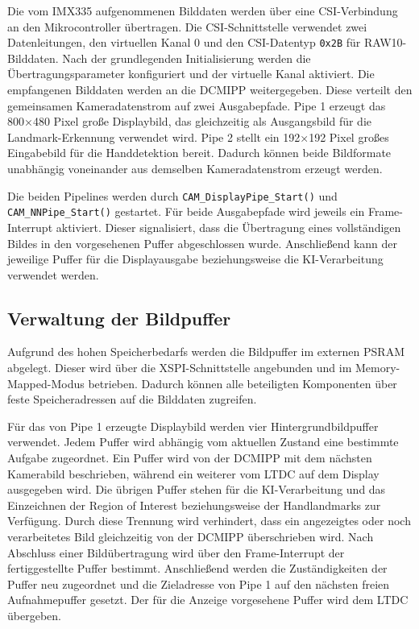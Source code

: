 Die vom IMX335 aufgenommenen Bilddaten werden über eine CSI-Verbindung an den Mikrocontroller übertragen. Die CSI-Schnittstelle verwendet zwei Datenleitungen, den virtuellen Kanal 0 und den CSI-Datentyp \texttt{0x2B} für RAW10-Bilddaten. Nach der grundlegenden Initialisierung werden die Übertragungsparameter konfiguriert und der virtuelle Kanal aktiviert. Die empfangenen Bilddaten werden an die DCMIPP weitergegeben. Diese verteilt den gemeinsamen Kameradatenstrom auf zwei Ausgabepfade. Pipe 1 erzeugt das 800×480 Pixel große Displaybild, das gleichzeitig als Ausgangsbild für die Landmark-Erkennung verwendet wird. Pipe 2 stellt ein 192×192 Pixel großes Eingabebild für die Handdetektion bereit. Dadurch können beide Bildformate unabhängig voneinander aus demselben Kameradatenstrom erzeugt werden.

Die beiden Pipelines werden durch \texttt{CAM\_DisplayPipe\_Start()} und \texttt{CAM\_NNPipe\_Start()} gestartet. Für beide Ausgabepfade wird jeweils ein Frame-Interrupt aktiviert. Dieser signalisiert, dass die Übertragung eines vollständigen Bildes in den vorgesehenen Puffer abgeschlossen wurde. Anschließend kann der jeweilige Puffer für die Displayausgabe beziehungsweise die KI-Verarbeitung verwendet werden. 
\subsection{Verwaltung der Bildpuffer}\label{sub:bildpuffer}

Aufgrund des hohen Speicherbedarfs werden die Bildpuffer im externen PSRAM abgelegt. Dieser wird über die XSPI-Schnittstelle angebunden und im Memory-Mapped-Modus betrieben. Dadurch können alle beteiligten Komponenten über feste Speicheradressen auf die Bilddaten zugreifen. 

Für das von Pipe 1 erzeugte Displaybild werden vier Hintergrundbildpuffer verwendet. Jedem Puffer wird abhängig vom aktuellen Zustand eine bestimmte Aufgabe zugeordnet. Ein Puffer wird von der DCMIPP mit dem nächsten Kamerabild beschrieben, während ein weiterer vom LTDC auf dem Display ausgegeben wird. Die übrigen Puffer stehen für die KI-Verarbeitung und das Einzeichnen der Region of Interest beziehungsweise der Handlandmarks zur Verfügung. Durch diese Trennung wird verhindert, dass ein angezeigtes oder noch verarbeitetes Bild gleichzeitig von der DCMIPP überschrieben wird. Nach Abschluss einer Bildübertragung wird über den Frame-Interrupt der fertiggestellte Puffer bestimmt. Anschließend werden die Zuständigkeiten der Puffer neu zugeordnet und die Zieladresse von Pipe 1 auf den nächsten freien Aufnahmepuffer gesetzt. Der für die Anzeige vorgesehene Puffer wird dem LTDC übergeben.

